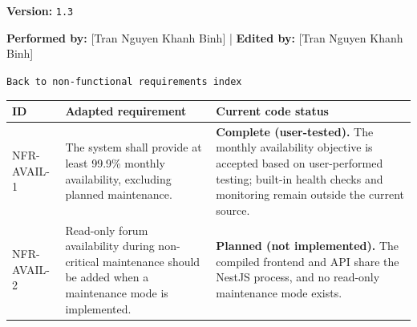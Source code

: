 \documentclass[12pt]{article}
\renewcommand{\baselinestretch}{1.5}
\begin{document}
\textbf{Version:} \texttt{1.3}
\par\medskip

\textbf{Performed by:} [Tran Nguyen Khanh Binh] | \textbf{Edited by:} [Tran Nguyen Khanh Binh]
\par\medskip

\texttt{Back to non-functional requirements index}
\par\medskip

\begingroup
\small
\renewcommand{\baselinestretch}{1.0}\selectfont
\renewcommand{\arraystretch}{1.15}
\setlength{\tabcolsep}{6pt}
\begin{longtable}{|>{\raggedright\arraybackslash}p{}|>{\raggedright\arraybackslash}p{}|>{\raggedright\arraybackslash}p{}|}
\hline
\textbf{ID} & \textbf{Adapted requirement} & \textbf{Current code status} \\ \hline
\endhead
NFR-AVAIL-1 & The system shall provide at least 99.9\% monthly availability, excluding planned maintenance. & \textbf{Complete (user-tested).} The monthly availability objective is accepted based on user-performed testing; built-in health checks and monitoring remain outside the current source. \\ \hline
NFR-AVAIL-2 & Read-only forum availability during non-critical maintenance should be added when a maintenance mode is implemented. & \textbf{Planned (not implemented).} The compiled frontend and API share the NestJS process, and no read-only maintenance mode exists. \\ \hline
\end{longtable}
\endgroup
\par\medskip
\end{document}
